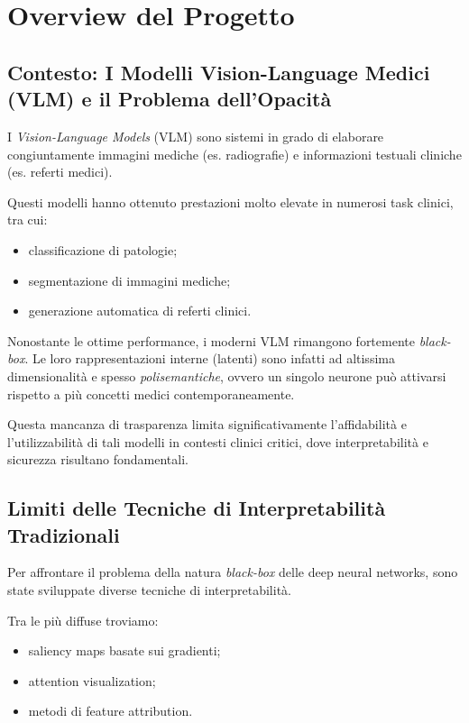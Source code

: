 % 
% 

\chapter{Overview del Progetto}

\section{Contesto: I Modelli Vision-Language Medici (VLM) e il Problema dell'Opacità}

I \textit{Vision-Language Models} (VLM) sono sistemi in grado di elaborare congiuntamente immagini mediche (es. radiografie) e informazioni testuali cliniche (es. referti medici).

Questi modelli hanno ottenuto prestazioni molto elevate in numerosi task clinici, tra cui:

\begin{itemize}
    \item classificazione di patologie;
    \item segmentazione di immagini mediche;
    \item generazione automatica di referti clinici.
\end{itemize}

Nonostante le ottime performance, i moderni VLM rimangono fortemente \textit{black-box}. Le loro rappresentazioni interne (latenti) sono infatti ad altissima dimensionalità e spesso \textit{polisemantiche}, ovvero un singolo neurone può attivarsi rispetto a più concetti medici contemporaneamente.

Questa mancanza di trasparenza limita significativamente l'affidabilità e l'utilizzabilità di tali modelli in contesti clinici critici, dove interpretabilità e sicurezza risultano fondamentali.

\section{Limiti delle Tecniche di Interpretabilità Tradizionali}

Per affrontare il problema della natura \textit{black-box} delle deep neural networks, sono state sviluppate diverse tecniche di interpretabilità.

Tra le più diffuse troviamo:

\begin{itemize}
    \item saliency maps basate sui gradienti;
    \item attention visualization;
    \item metodi di feature attribution.
\end{itemize}

